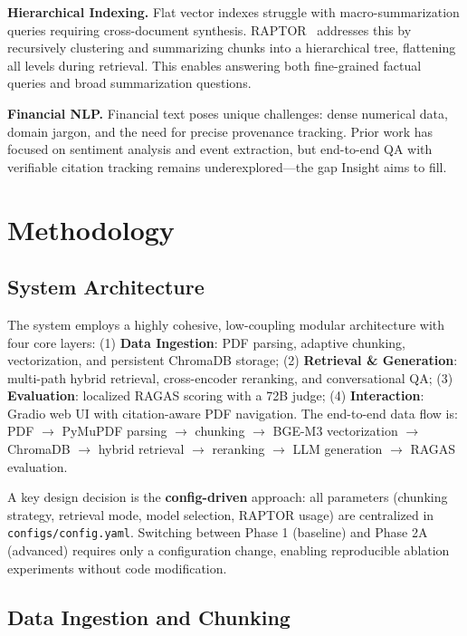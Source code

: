 \documentclass[11pt, a4paper]{article}
\begin{document}
\noindent\textbf{Hierarchical Indexing.} Flat vector indexes struggle with macro-summarization queries requiring cross-document synthesis. RAPTOR~\cite{raptor} addresses this by recursively clustering and summarizing chunks into a hierarchical tree, flattening all levels during retrieval. This enables answering both fine-grained factual queries and broad summarization questions.

\noindent\textbf{Financial NLP.} Financial text poses unique challenges: dense numerical data, domain jargon, and the need for precise provenance tracking. Prior work has focused on sentiment analysis and event extraction, but end-to-end QA with verifiable citation tracking remains underexplored---the gap Insight aims to fill.

\section{Methodology}

\subsection{System Architecture}

The system employs a highly cohesive, low-coupling modular architecture with four core layers: (1) \textbf{Data Ingestion}: PDF parsing, adaptive chunking, vectorization, and persistent ChromaDB storage; (2) \textbf{Retrieval \& Generation}: multi-path hybrid retrieval, cross-encoder reranking, and conversational QA; (3) \textbf{Evaluation}: localized RAGAS scoring with a 72B judge; (4) \textbf{Interaction}: Gradio web UI with citation-aware PDF navigation. The end-to-end data flow is: PDF $\rightarrow$ PyMuPDF parsing $\rightarrow$ chunking $\rightarrow$ BGE-M3 vectorization $\rightarrow$ ChromaDB $\rightarrow$ hybrid retrieval $\rightarrow$ reranking $\rightarrow$ LLM generation $\rightarrow$ RAGAS evaluation.

A key design decision is the \textbf{config-driven} approach: all parameters (chunking strategy, retrieval mode, model selection, RAPTOR usage) are centralized in \texttt{configs/config.yaml}. Switching between Phase 1 (baseline) and Phase 2A (advanced) requires only a configuration change, enabling reproducible ablation experiments without code modification.

\subsection{Data Ingestion and Chunking}
\end{document}
